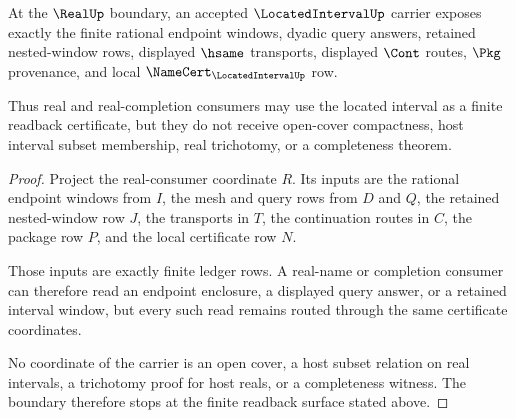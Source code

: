 \begin{theorem}
\label{thm:locatedinterval-real-consumer-boundary}
At the $\RealUp$ boundary, an accepted $\LocatedIntervalUp$ carrier exposes exactly the finite rational endpoint windows, dyadic query answers, retained nested-window rows, displayed $\hsame$ transports, displayed $\Cont$ routes, $\Pkg$ provenance, and local $\NameCert_{\LocatedIntervalUp}$ row.

Thus real and real-completion consumers may use the located interval as a finite readback certificate, but they do not receive open-cover compactness, host interval subset membership, real trichotomy, or a completeness theorem.
\end{theorem}
\begin{proof}
Project the real-consumer coordinate $R$. Its inputs are the rational endpoint windows from $I$, the mesh and query rows from $D$ and $Q$, the retained nested-window row $J$, the transports in $T$, the continuation routes in $C$, the package row $P$, and the local certificate row $N$.

Those inputs are exactly finite ledger rows. A real-name or completion consumer can therefore read an endpoint enclosure, a displayed query answer, or a retained interval window, but every such read remains routed through the same certificate coordinates.

No coordinate of the carrier is an open cover, a host subset relation on real intervals, a trichotomy proof for host reals, or a completeness witness. The boundary therefore stops at the finite readback surface stated above.
\end{proof}

